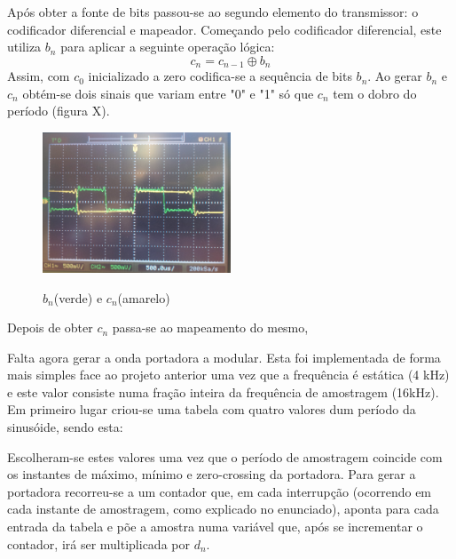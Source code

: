 \documentclass[11pt]{article}
\begin{document}
Após obter a fonte de bits passou-se ao segundo elemento do transmissor: o codificador diferencial e mapeador. Começando pelo codificador diferencial, este utiliza $b_n$ para aplicar a seguinte operação lógica:
\begin{equation}
c_n=c_{n-1} \oplus b_n
\end{equation}
Assim, com $c_0$ inicializado a zero codifica-se a sequência de bits $ b_n $. Ao gerar $ b_n $ e $ c_n $ obtém-se dois sinais que variam entre "0" e "1" só que $ c_n $ tem o dobro do período (figura X).
\begin{figure}[h]
	\centering
	\includegraphics[width=0.5\textwidth]{./bn_cn}~\\
	\caption{$ b_n $(verde) e $ c_n $(amarelo)}
\end{figure}

Depois de obter $ c_n $ passa-se ao mapeamento do mesmo,

Falta agora gerar a onda portadora a modular. Esta foi implementada de forma mais simples face ao projeto anterior uma vez que a frequência é estática (4 kHz) e este valor consiste numa fração inteira da frequência de amostragem (16kHz).
Em primeiro lugar criou-se uma tabela com quatro valores dum período da sinusóide, sendo esta: %

Escolheram-se estes valores uma vez que o período de amostragem coincide com os instantes de máximo, mínimo e zero-crossing da portadora. Para gerar a portadora recorreu-se a um contador que, em cada interrupção (ocorrendo em cada instante de amostragem, como explicado no enunciado), aponta para cada entrada da tabela e põe a amostra numa variável que, após se incrementar o contador, irá ser multiplicada por $d_n$. 
\end{document}
